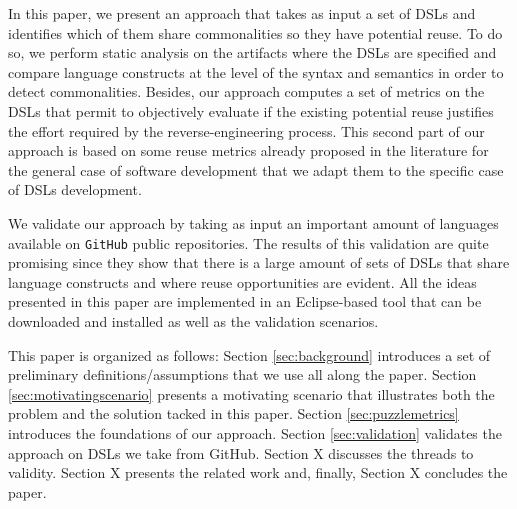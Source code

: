 In this paper, we present an approach that takes as input a set of DSLs and identifies which of them share commonalities so they have potential reuse. To do so, we perform static analysis on the artifacts where the DSLs are specified and compare language constructs at the level of the syntax and semantics in order to detect commonalities. Besides, our approach computes a set of metrics on the DSLs that permit to objectively evaluate if the existing potential reuse justifies the effort required by the reverse-engineering process. This second part of our approach is based on some reuse metrics already proposed in the literature for the general case of software development \cite{Berger:2014,Berger:126283} that we adapt them to the specific case of DSLs development.

We validate our approach by taking as input an important amount of languages available on \texttt{GitHub} public repositories. The results of this validation are quite promising since they show that there is a large amount of sets of DSLs that share language constructs and where reuse opportunities are evident. All the ideas presented in this paper are implemented in an Eclipse-based tool that can be downloaded and installed as well as the validation scenarios. 


This paper is organized as follows: Section \ref{sec:background} introduces a set of preliminary definitions/assumptions that we use all along the paper. Section \ref{sec:motivatingscenario} presents a motivating scenario that illustrates both the problem and the solution tacked in this paper. Section \ref{sec:puzzlemetrics} introduces the foundations of our approach. Section \ref{sec:validation} validates the approach on DSLs we take from GitHub. Section X discusses the threads to validity. Section X presents the related work and, finally, Section X concludes the paper. 

